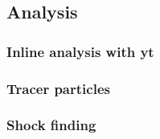 \subsection{Analysis}
\label{sec.num.analysis}

\subsubsection{Inline analysis with yt}

\subsubsection{Tracer particles}

\subsubsection{Shock finding}

